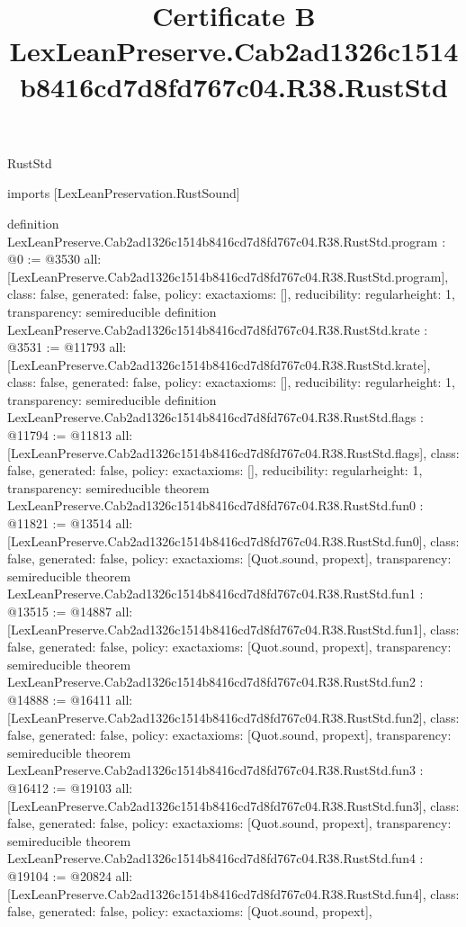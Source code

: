 \begin{lexlean}{RustStd}
\title{Certificate B LexLeanPreserve.Cab2ad1326c1514b8416cd7d8fd767c04.R38.RustStd}
\begin{coremodule}
imports [LexLeanPreservation.RustSound]

definition LexLeanPreserve.Cab2ad1326c1514b8416cd7d8fd767c04.R38.RustStd.program : @0 := @3530 {
  all: [LexLeanPreserve.Cab2ad1326c1514b8416cd7d8fd767c04.R38.RustStd.program],
  class: false,
  generated: false,
  policy: exact{axioms: []},
  reducibility: regular{height: 1},
  transparency: semireducible
}
definition LexLeanPreserve.Cab2ad1326c1514b8416cd7d8fd767c04.R38.RustStd.krate : @3531 := @11793 {
  all: [LexLeanPreserve.Cab2ad1326c1514b8416cd7d8fd767c04.R38.RustStd.krate],
  class: false,
  generated: false,
  policy: exact{axioms: []},
  reducibility: regular{height: 1},
  transparency: semireducible
}
definition LexLeanPreserve.Cab2ad1326c1514b8416cd7d8fd767c04.R38.RustStd.flags : @11794 := @11813 {
  all: [LexLeanPreserve.Cab2ad1326c1514b8416cd7d8fd767c04.R38.RustStd.flags],
  class: false,
  generated: false,
  policy: exact{axioms: []},
  reducibility: regular{height: 1},
  transparency: semireducible
}
theorem LexLeanPreserve.Cab2ad1326c1514b8416cd7d8fd767c04.R38.RustStd.fun0 : @11821 := @13514 {
  all: [LexLeanPreserve.Cab2ad1326c1514b8416cd7d8fd767c04.R38.RustStd.fun0],
  class: false,
  generated: false,
  policy: exact{axioms: [Quot.sound, propext]},
  transparency: semireducible
}
theorem LexLeanPreserve.Cab2ad1326c1514b8416cd7d8fd767c04.R38.RustStd.fun1 : @13515 := @14887 {
  all: [LexLeanPreserve.Cab2ad1326c1514b8416cd7d8fd767c04.R38.RustStd.fun1],
  class: false,
  generated: false,
  policy: exact{axioms: [Quot.sound, propext]},
  transparency: semireducible
}
theorem LexLeanPreserve.Cab2ad1326c1514b8416cd7d8fd767c04.R38.RustStd.fun2 : @14888 := @16411 {
  all: [LexLeanPreserve.Cab2ad1326c1514b8416cd7d8fd767c04.R38.RustStd.fun2],
  class: false,
  generated: false,
  policy: exact{axioms: [Quot.sound, propext]},
  transparency: semireducible
}
theorem LexLeanPreserve.Cab2ad1326c1514b8416cd7d8fd767c04.R38.RustStd.fun3 : @16412 := @19103 {
  all: [LexLeanPreserve.Cab2ad1326c1514b8416cd7d8fd767c04.R38.RustStd.fun3],
  class: false,
  generated: false,
  policy: exact{axioms: [Quot.sound, propext]},
  transparency: semireducible
}
theorem LexLeanPreserve.Cab2ad1326c1514b8416cd7d8fd767c04.R38.RustStd.fun4 : @19104 := @20824 {
  all: [LexLeanPreserve.Cab2ad1326c1514b8416cd7d8fd767c04.R38.RustStd.fun4],
  class: false,
  generated: false,
  policy: exact{axioms: [Quot.sound, propext]},
}
\end{coremodule}
\end{lexlean}
